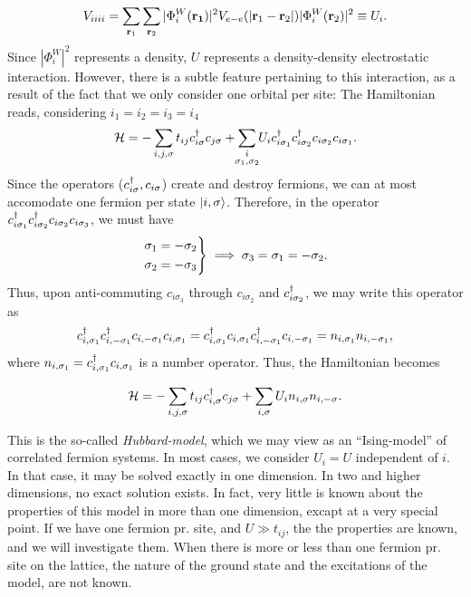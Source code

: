 \begin{equation}
	V_{iiii} = \sum_{\vb{r}_1}\sum_{\vb{r}_2}|\Phi_{i}^{W}(\vb{r_1})|^2V_{e-e}(|\vb{r}_1-\vb{r}_2|)|\Phi_{i}^{W}(\vb{r}_2)|^2 \equiv U_i.
\end{equation}
Since $ |\Phi_{i}^{W}|^2 $ represents a density, $U$ represents a density-density electrostatic interaction. However, there is a subtle feature pertaining to this interaction, as a result of the fact that we only consider one orbital per site: 
The Hamiltonian reads, considering $i_1 = i_2=i_3=i_4$
\begin{equation}
	\Ha = -\sum_{i,j,\sigma}t_{ij}\cd_{i\sigma}c_{j\sigma} + \sum_{\mathclap{\substack{i\\ \sigma_1, \sigma_2}}}U_i\cd_{i\sigma_1}\cd_{i\sigma_2}c_{i\sigma_2}c_{i\sigma_1}.
\end{equation}
Since the operators ($c^{\dagger}_{i\sigma},c_{i\sigma}$) create and destroy fermions, we can at most accomodate one fermion per state $\ket{i,\sigma}$. Therefore, in the operator $c^{\dagger}_{i\sigma_1}c^{\dagger}_{i\sigma_2}c_{i\sigma_2}c_{i\sigma_3}$, we must have
\begin{equation}
	\begin{rcases}
		\sigma_1 =-\sigma_2 \\
		\sigma_2 = -\sigma_3
	\end{rcases}
	\implies \sigma_3 = \sigma_1 = -\sigma_2.
\end{equation}
Thus, upon anti-commuting $c_{i\sigma_3}$ through $c_{i\sigma_2}$ and $c^{\dagger}_{i\sigma_2}$, we may write this operator as 
\begin{equation}
	c^{\dagger}_{i,\sigma_1}c^{\dagger}_{i,-\sigma_1}c_{i,-\sigma_1}c_{i,\sigma_1} = 	c^{\dagger}_{i,\sigma_1}c_{i,\sigma_1}c^{\dagger}_{i,-\sigma_1}c_{i,-\sigma_1} = n_{i,\sigma_1}n_{i,-\sigma_1},
\end{equation}
where $n_{i,\sigma_1} = c^{\dagger}_{i,\sigma_1}c_{i,\sigma_1}$ is a number operator. Thus, the Hamiltonian becomes
\begin{tcolorbox}
	\begin{equation}
		\mathcal{H} = - \sum_{i,j,\sigma}t_{ij}c^{\dagger}_{i,\sigma}c_{j\sigma} + \sum_{i,\sigma}U_i n_{i,\sigma}n_{i,-\sigma}.
	\end{equation}
\end{tcolorbox}
This is the so-called \emph{Hubbard-model}, which we may view as an ``Ising-model'' of correlated fermion systems.
In most cases, we consider $U_i = U$ independent of $i$. In that case, it may be solved exactly in one dimension. In two and higher dimensions, no exact solution exists. In fact, very little is known about the properties of this model in more than one dimension, excapt at a very special point. If we have one fermion pr. site, and $U\gg t_{ij}$, the the properties are known, and we will investigate them. When there is more or less than one fermion pr. site on the lattice, the nature of the ground state and the excitations of the model, are not known. 
